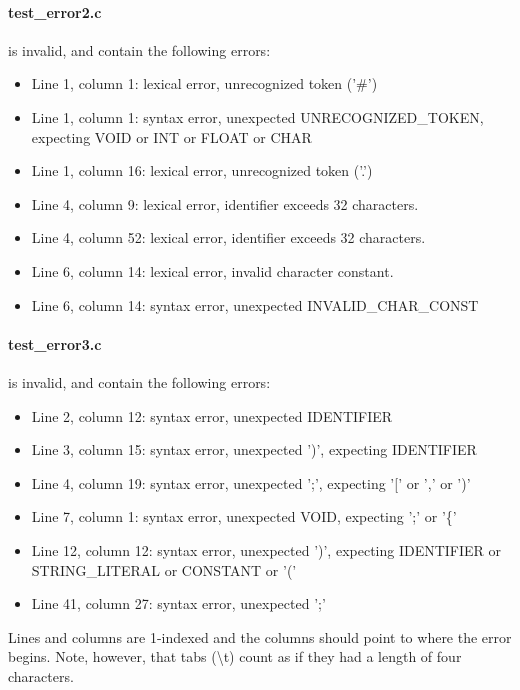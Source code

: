 \paragraph{test{\_}error2.c} is invalid, and contain the following errors:
\begin{itemize}
\item Line 1, column 1: lexical error, unrecognized token ('\#')
\item Line 1, column 1: syntax error, unexpected UNRECOGNIZED\_TOKEN, expecting VOID or INT or FLOAT or CHAR
\item Line 1, column 16: lexical error, unrecognized token ('.')
\item Line 4, column 9: lexical error, identifier exceeds 32 characters.
\item Line 4, column 52: lexical error, identifier exceeds 32 characters.
\item Line 6, column 14: lexical error, invalid character constant.
\item Line 6, column 14: syntax error, unexpected INVALID\_CHAR\_CONST
\end{itemize}

\paragraph{test{\_}error3.c} is invalid, and contain the following errors:
\begin{itemize}
\item Line 2, column 12: syntax error, unexpected IDENTIFIER
\item Line 3, column 15: syntax error, unexpected ')', expecting IDENTIFIER
\item Line 4, column 19: syntax error, unexpected ';', expecting '[' or ',' or ')'
\item Line 7, column 1: syntax error, unexpected VOID, expecting ';' or '\{'
\item Line 12, column 12: syntax error, unexpected ')', expecting IDENTIFIER or STRING\_LITERAL or CONSTANT or '('
\item Line 41, column 27: syntax error, unexpected ';'
\end{itemize}

Lines and columns are 1-indexed and the columns should point to where the error begins.
Note, however, that tabs (\textbackslash t) count as if they had a length of four characters.
